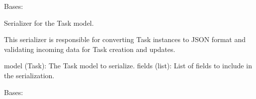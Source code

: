 \documentclass[letterpaper,10pt,english]{sphinxmanual}
\begin{document}
\begin{fulllineitems}
\label{\detokenize{tasks:tasks.serializers.TaskSerializer}}
\pysigstartsignatures
{}
\pysigstopsignatures
\sphinxAtStartPar
Bases: 

\sphinxAtStartPar
Serializer for the Task model.

\sphinxAtStartPar
This serializer is responsible for converting Task instances to JSON format 
and validating incoming data for Task creation and updates.
\begin{description}
\sphinxAtStartPar
model (Task): The Task model to serialize.
fields (list): List of fields to include in the serialization.

\end{description}

\begin{fulllineitems}
\label{\detokenize{tasks:tasks.serializers.TaskSerializer.Meta}}
\pysigstartsignatures
{}
\pysigstopsignatures
\sphinxAtStartPar
Bases: 

\begin{fulllineitems}
\label{\detokenize{tasks:tasks.serializers.TaskSerializer.Meta.fields}}
\pysigstartsignatures
{}
\pysigstopsignatures
\end{fulllineitems}



\end{fulllineitems}
\end{fulllineitems}
\end{document}
